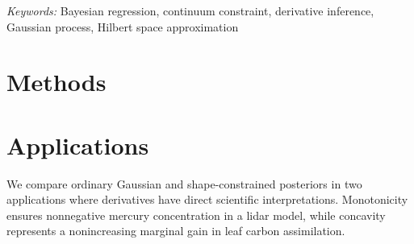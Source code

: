 \maketitle
\def\CombinedProofZone{main}
\begin{abstract}
We study how to condition an existing Hilbert space Gaussian process
(HSGP) expansion on positivity, monotonicity, or convexity throughout
an interval. The expansion has Gaussian coefficients whose variances
are given by the kernel's spectral density. At fixed covariance and
noise parameters, we retain this coefficient law and represent each
complete interval event as a threshold on one coefficient. Integrating
out that coefficient gives a strongly log-concave marginal posterior
with a normal survival weight, while conditional truncated normal
sampling recovers the full constrained law. The construction also
covers joint restrictions within the finite expansion. For individual
restrictions, we characterize the thresholds through polynomial
equations and bound posterior error from conservative numerical
evaluation in total variation. Under spectral regularity, the
conditioned finite posteriors converge in quadratic Wasserstein
distance to the corresponding conditioned underlying GP posteriors as
the computational interval expands and higher frequencies are
retained. This convergence controls uniform discrepancies in the
response and derivatives through the constrained order. Mercury lidar
and leaf light-response applications illustrate the consequences for
derivative inference.
\end{abstract}
\noindent\textit{Keywords:} Bayesian regression, continuum constraint,
derivative inference, Gaussian process, Hilbert space approximation

\section{Methods}\label{sec:methodology}




\FloatBarrier
\section{Applications}\label{sec:applications}
We compare ordinary Gaussian and shape-constrained posteriors in two
applications where derivatives have direct scientific interpretations.
Monotonicity ensures nonnegative mercury concentration in a lidar model,
while concavity represents a nonincreasing marginal gain in leaf carbon
assimilation.


\FloatBarrier

\FloatBarrier




